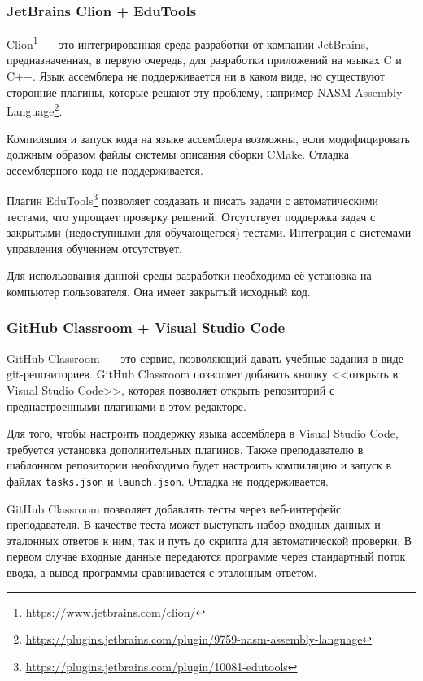 \documentclass[a4paper,article,14pt]{extarticle}
\begin{document}
\subsubsection{JetBrains Clion + EduTools}

Clion\footnote{\url{https://www.jetbrains.com/clion/}}~--- это интегрированная среда разработки от компании JetBrains, предназначенная, в первую очередь, для разработки приложений на языках C и C++. Язык ассемблера не поддерживается ни в каком виде, но существуют сторонние плагины, которые решают эту проблему, например NASM Assembly Language\footnote{\url{https://plugins.jetbrains.com/plugin/9759-nasm-assembly-language}}.

Компиляция и запуск кода на языке ассемблера возможны, если модифицировать должным образом файлы системы описания сборки CMake. Отладка ассемблерного кода не поддерживается.

Плагин EduTools\footnote{\url{https://plugins.jetbrains.com/plugin/10081-edutools}} позволяет создавать и писать задачи с автоматическими тестами, что упрощает проверку решений. Отсутствует поддержка задач с закрытыми (недоступными для обучающегося) тестами. Интеграция с системами управления обучением отсутствует.

Для использования данной среды разработки необходима её установка на компьютер пользователя. Она имеет закрытый исходный код.

\subsubsection{GitHub Classroom + Visual Studio Code}

GitHub Classroom~--- это сервис, позволяющий давать учебные задания в виде git-репозиториев. GitHub Classroom позволяет добавить кнопку <<открыть в Visual Studio Code>>, которая позволяет открыть репозиторий с преднастроенными плагинами в этом редакторе.

Для того, чтобы настроить поддержку языка ассемблера в Visual Studio Code, требуется установка дополнительных плагинов. Также преподавателю в шаблонном репозитории необходимо будет настроить компиляцию и запуск в файлах \texttt{tasks.json} и \texttt{launch.json}. Отладка не поддерживается.

GitHub Classroom позволяет добавлять тесты через веб-интерфейс преподавателя. В качестве теста может выступать набор входных данных и эталонных ответов к ним, так и путь до скрипта для автоматической проверки. В первом случае входные данные передаются программе через стандартный поток ввода, а вывод программы сравнивается с эталонным ответом.
\end{document}
